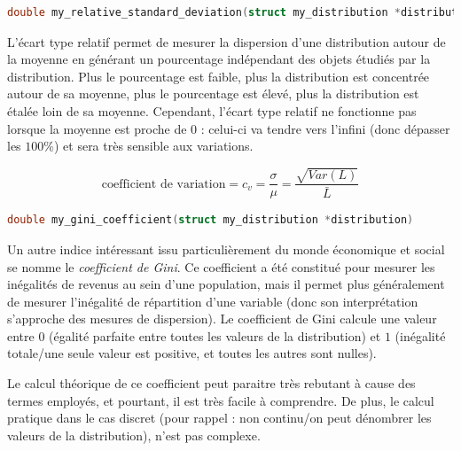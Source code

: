\documentclass[11pt,a4paper]{article}
\begin{document}
\begin{lstlisting}[language=C,morekeywords={floor,ceil}]
double my_relative_standard_deviation(struct my_distribution *distribution) \end{lstlisting}


L'écart type relatif permet de mesurer la dispersion d'une distribution autour de la moyenne en générant un pourcentage indépendant des objets étudiés par la distribution.
Plus le pourcentage est faible, plus la distribution est concentrée autour de sa moyenne, plus le pourcentage est élevé, plus la distribution est étalée loin de sa moyenne.
Cependant, l'écart type relatif ne fonctionne pas lorsque la moyenne est proche de $ 0 $ : celui-ci va tendre vers l'infini (donc dépasser les $ 100\% $) et sera très sensible aux variations.
%
\begin{center}
\begin{equation*}
\text{coefficient de variation} = c_{v} = \frac{\sigma}{\mu} = \frac{\sqrt{Var(L)}}{\bar{L}}
\end{equation*}
\end{center}


\bigskip



\begin{lstlisting}[language=C,morekeywords={floor,ceil}]
double my_gini_coefficient(struct my_distribution *distribution) \end{lstlisting}

Un autre indice intéressant issu particulièrement du monde économique et social se nomme le \textit{coefficient de Gini}.
Ce coefficient a été constitué pour mesurer les inégalités de revenus au sein d'une population, mais il permet plus généralement de mesurer l'inégalité de répartition d'une variable (donc son interprétation s'approche des mesures de dispersion).
Le coefficient de Gini calcule une valeur entre $ 0 $ (égalité parfaite entre toutes les valeurs de la distribution) et $ 1 $ (inégalité totale/une seule valeur est positive, et toutes les autres sont nulles).

Le calcul théorique de ce coefficient peut paraitre très rebutant à cause des termes employés, et pourtant, il est très facile à comprendre.
De plus, le calcul pratique dans le cas discret (pour rappel : non continu/on peut dénombrer les valeurs de la distribution), n'est pas complexe.
\end{document}
